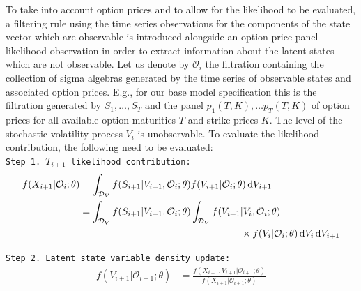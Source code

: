 \documentclass[11pt,a4paper,notitlepage]{article}
\numberwithin{equation}{section}
\begin{document}
To take into account option prices and to allow for the likelihood to be evaluated, a filtering rule using the time series observations for the components of the state vector which are observable is introduced alongside an option price panel likelihood observation in order to extract information about the latent states which are not observable.  Let us denote by $\mathcal{O}_i$ the filtration containing the collection of sigma algebras generated by the time series of observable states and associated option prices. E.g., for our base model specification this is the filtration generated by $S_{1},\dots,S_{T}$ and the panel $p_{1}(T,K),\dots  p_{T}(T,K)$ of option prices for all available option maturities $T$ and strike prices $K$. The level of the stochastic volatility process $V_{i}$ is unobservable. To evaluate the likelihood contribution, the following need to be evaluated:\vspace{+5pt}\\
\texttt{Step 1. $T_{i+1}$ likelihood contribution:} \vspace{-5pt}
\begin{align}
f(X_{i+1}|\mathcal{O}_{i};\theta) &=\int_{\mathcal{D}_{V}}  f(S_{i+1}|{V}_{i+1},\mathcal{O}_i;\theta) f(V_{i+1}|\mathcal{O}_i;\theta) \dif{V_{i+1}} \notag\\
&=\int_{\mathcal{D}_{V}} f(S_{i+1}|{V}_{i+1},\mathcal{O}_i; \theta) \int_{\mathcal{D}_{V}} f(V_{i+1}|{V}_{i},\mathcal{O}_i;\theta) \notag \\
& \hspace{165pt} \times f(V_{i}|\mathcal{O}_i; \theta)  \dif V_{i} \dif{V_{i+1}}\label{LikelihoodContribTheo}
\end{align}

\texttt{Step 2. Latent state variable density update:}\vspace{-5pt}
\begin{align}
f(V_{i+1}|\mathcal{O}_{i+1}; \theta) &= \frac{f(X_{i+1},V_{i+1}|\mathcal{O}_{i+1}; \theta)}{f(X_{i+1}|\mathcal{O}_{i+1}; \theta)} \label{SamplingDensityTheo}
\end{align}
%
\end{document}
